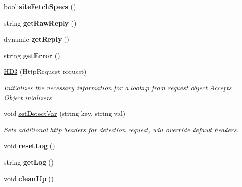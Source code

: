 \begin{DoxyCompactItemize}
\item 
\hypertarget{class_h_d3_1_1_h_d3_ae8d86be9f088829ebe42214cfb26672e}{bool {\bfseries site\+Fetch\+Specs} ()}\label{class_h_d3_1_1_h_d3_ae8d86be9f088829ebe42214cfb26672e}

\item 
\hypertarget{class_h_d3_1_1_h_d3_a08cdeab81f9bddbfb126a7321ea2fd8c}{string {\bfseries get\+Raw\+Reply} ()}\label{class_h_d3_1_1_h_d3_a08cdeab81f9bddbfb126a7321ea2fd8c}

\item 
\hypertarget{class_h_d3_1_1_h_d3_ad79fcc6a7b1e5d38abc7219af87b3a2f}{dynamic {\bfseries get\+Reply} ()}\label{class_h_d3_1_1_h_d3_ad79fcc6a7b1e5d38abc7219af87b3a2f}

\item 
\hypertarget{class_h_d3_1_1_h_d3_a3dc243815bb91775b05d6fb148959983}{string {\bfseries get\+Error} ()}\label{class_h_d3_1_1_h_d3_a3dc243815bb91775b05d6fb148959983}

\item 
\hyperlink{class_h_d3_1_1_h_d3_a0a238bb9c0e43132312e5c863292c577}{H\+D3} (Http\+Request request)
\begin{DoxyCompactList}\small\item\em Initializes the necessary information for a lookup from request object Accepts Object inializers \end{DoxyCompactList}\item 
void \hyperlink{class_h_d3_1_1_h_d3_a658104a63e4bac0a909cdcfed8c2d49b}{set\+Detect\+Var} (string key, string val)
\begin{DoxyCompactList}\small\item\em Sets additional http headers for detection request, will override default headers.\end{DoxyCompactList}\item 
\hypertarget{class_h_d3_1_1_h_d3_a92e1a5bec8573497497bb7e4082a6b5c}{void {\bfseries reset\+Log} ()}\label{class_h_d3_1_1_h_d3_a92e1a5bec8573497497bb7e4082a6b5c}

\item 
\hypertarget{class_h_d3_1_1_h_d3_a2436e33681884291c6ad1b2ee112e17b}{string {\bfseries get\+Log} ()}\label{class_h_d3_1_1_h_d3_a2436e33681884291c6ad1b2ee112e17b}

\item 
\hypertarget{class_h_d3_1_1_h_d3_a0431d69035a8245a195f9060d5525790}{void {\bfseries clean\+Up} ()}\label{class_h_d3_1_1_h_d3_a0431d69035a8245a195f9060d5525790}


\end{DoxyCompactItemize}
